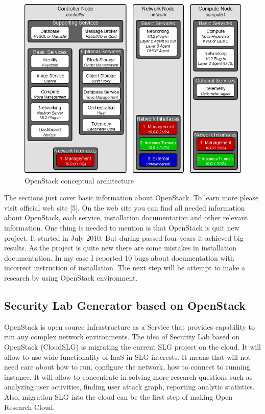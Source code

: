 \begin{figure}[ht!]
\centering
\includegraphics[width=\textwidth]{openstack_architecture.png}
\caption{OpenStack conceptual architecture}
\label{overflow}
\end{figure}

The sections just cover basic information about OpenStack. To learn more please visit official web site [5]. On the web site you can find all needed information about OpenStack, each service, installation documentation and other relevant information. One thing is needed to mention is that OpenStack is quit new project. It started in July 2010. But during passed four years it achieved big results. As the project is quite new there are some mistakes in installation documentation. In my case I reported 10 bugs about documentation with incorrect instruction of installation.
The next step will be attempt to make a research by using OpenStack environment. 


\subsection{Security Lab Generator based on OpenStack}
OpenStack is open source Infrastructure as a Service that provides capability to run any complex network environments. The idea of Security Lab based on OpenStack (CloudSLG) is migrating the current SLG project on the cloud. It will allow to use wide functionality of IaaS in SLG interests. It means that will not need care about how to run, configure the network, how to connect to running instance. It will allow to concentrate in solving more research questions such as analyzing user activities, finding user attack graph, reporting analytic statistics. Also, migration SLG into the cloud can be the first step of making Open Research Cloud.    





% 